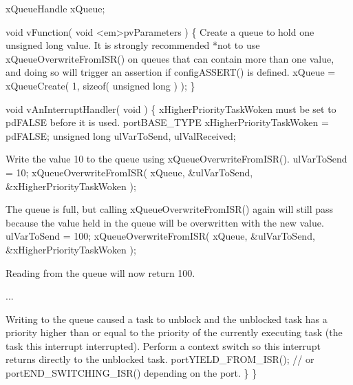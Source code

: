 \begin{DoxyPre} xQueueHandle xQueue;\end{DoxyPre}



\begin{DoxyPre} void vFunction( void <em>pvParameters )
 \{
Create a queue to hold one unsigned long value.  It is strongly
recommended *not to use xQueueOverwriteFromISR() on queues that can
contain more than one value, and doing so will trigger an assertion
if configASSERT() is defined.
        xQueue = xQueueCreate( 1, sizeof( unsigned long ) );
\}\end{DoxyPre}



\begin{DoxyPre}void vAnInterruptHandler( void )
\{
xHigherPriorityTaskWoken must be set to pdFALSE before it is used.
portBASE\_TYPE xHigherPriorityTaskWoken = pdFALSE;
unsigned long ulVarToSend, ulValReceived;\end{DoxyPre}



\begin{DoxyPre}Write the value 10 to the queue using xQueueOverwriteFromISR().
        ulVarToSend = 10;
        xQueueOverwriteFromISR( xQueue, &ulVarToSend, &xHigherPriorityTaskWoken );\end{DoxyPre}



\begin{DoxyPre}The queue is full, but calling xQueueOverwriteFromISR() again will still
pass because the value held in the queue will be overwritten with the
new value.
        ulVarToSend = 100;
        xQueueOverwriteFromISR( xQueue, &ulVarToSend, &xHigherPriorityTaskWoken );\end{DoxyPre}



\begin{DoxyPre}Reading from the queue will now return 100.\end{DoxyPre}



\begin{DoxyPre}...
\begin{DoxyVerb}    if( xHigherPrioritytaskWoken == pdTRUE )
    {
\end{DoxyVerb}

Writing to the queue caused a task to unblock and the unblocked task
has a priority higher than or equal to the priority of the currently
executing task (the task this interrupt interrupted).  Perform a context
switch so this interrupt returns directly to the unblocked task.
                portYIELD\_FROM\_ISR(); // or portEND\_SWITCHING\_ISR() depending on the port.
        \}
\}
 \end{DoxyPre}
 